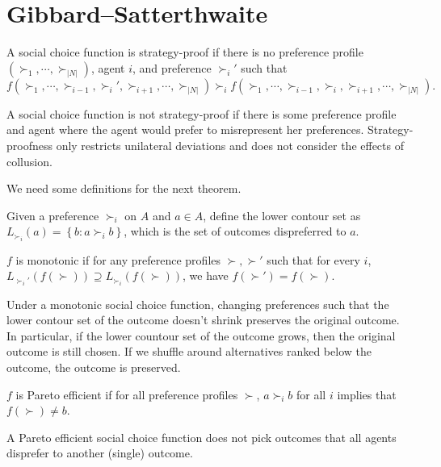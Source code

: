 \section{Gibbard--Satterthwaite}

\begin{definition}
	A social choice function is strategy-proof if there is no preference profile $\left( \succ_1, \cdots, \succ_{\left| N \right|} \right)$, agent $i$, and preference $\succ_i'$ such that \[
		f\left( \succ_1, \cdots, \succ_{i-1}, \succ_i', \succ_{i+1}, \cdots, \succ_{|N|} \right) \succ_i f\left( \succ_1, \cdots, \succ_{i-1}, \succ_i, \succ_{i+1}, \cdots, \succ_{|N|} \right)
	.\] 
\end{definition}
A social choice function is not strategy-proof if there is some preference profile and agent where the agent would prefer to misrepresent her preferences.
Strategy-proofness only restricts unilateral deviations and does not consider the effects of collusion.

We need some definitions for the next theorem.
\begin{definition}
	Given a preference $\succ_i$ on $A$ and $a \in A$, define the lower contour set as $L_{\succ_i}(a) = \left\{b: a \succ_i b\right\}$, which is the set of outcomes dispreferred to $a$.
\end{definition}

\begin{definition}
	$f$ is monotonic if for any preference profiles $\succ, \succ'$ such that for every $i$, $L_{\succ_i'}\left( f(\succ) \right) \supseteq L_{\succ_i}\left( f(\succ) \right)$, we have $f(\succ') = f(\succ)$.
\end{definition}
Under a monotonic social choice function, changing preferences such that the lower contour set of the outcome doesn't shrink preserves the original outcome. In particular, if the lower countour set of the outcome grows, then the original outcome is still chosen. If we shuffle around alternatives ranked below the outcome, the outcome is preserved.

\begin{definition}
	$f$ is Pareto efficient if for all preference profiles $\succ$, $a \succ_i b$ for all $i$ implies that $f(\succ) \ne b$.
\end{definition}
A Pareto efficient social choice function does not pick outcomes that all agents disprefer to another (single) outcome.

